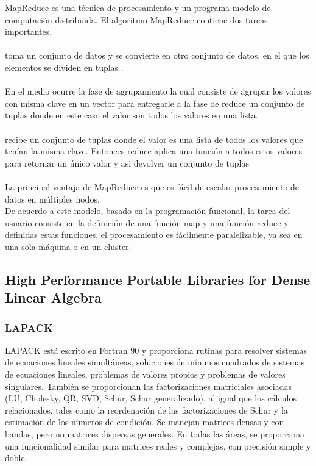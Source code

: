 MapReduce es una técnica de procesamiento y un programa modelo de computación
distribuida. El algoritmo MapReduce contiene dos tareas importantes.\\\\
 toma un conjunto de datos y se convierte en otro conjunto de datos, en el
que los elementos se dividen en tuplas .\\\\
En el medio ocurre la fase de agrupamiento la cual consiste de agrupar los valores
con misma clave en un vector para entregarle a la fase de reduce un conjunto de
tuplas  donde en este caso el valor son todos los valores
en una lista.\\\\
 recibe un conjunto de tuplas  donde el valor
es una lista de todos los valores que tenían la misma clave. Entonces reduce
aplica una función a todos estos valores para retornar un único valor y asi
devolver un conjunto de tuplas \\\\
La principal ventaja de MapReduce es que es fácil de escalar procesamiento de
datos en múltiples nodos.\\
De acuerdo a este modelo, basado en la programación funcional, la tarea del
usuario consiste en la definición de una función map y una función reduce y
definidas estas funciones, el procesamiento es fácilmente paralelizable, ya sea
en una sola máquina o en un cluster.\\

\subsection{High Performance Portable Libraries for Dense Linear Algebra}
    \def\text{overall picture}
    \def\path{overall.png}
    \def\scale{.6}
    
    \subsubsection{LAPACK}
        LAPACK está escrito en Fortran 90 y proporciona rutinas para resolver
        sistemas de ecuaciones lineales simultáneas, soluciones de mínimos
        cuadrados de sistemas de ecuaciones lineales, problemas de valores propios y
        problemas de valores singulares. También se proporcionan las factorizaciones
        matriciales asociadas (LU, Cholesky, QR, SVD, Schur, Schur generalizado),
        al igual que los cálculos relacionados, tales como la reordenación de las
        factorizaciones de Schur y la estimación de los números de condición. Se
        manejan matrices densas y con bandas, pero no matrices dispersas generales.
        En todas las áreas, se proporciona una funcionalidad similar para matrices
        reales y complejas, con precisión simple y doble.

